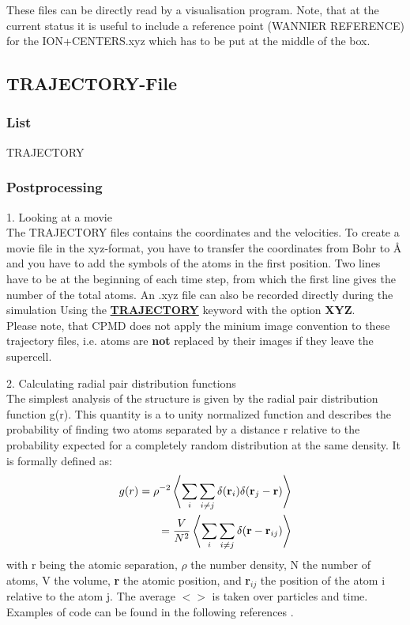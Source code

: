 \documentclass[twoside,10pt,titlepage,a4paper]{article}
\newcommand{\referto}[2]{\hyperlink{#1}{#2}}
\newcommand{\referto}[2]{\htmlref{#2}{#1}}
\newcommand{\refkeyword}[1]{%
\referto{#1}{\textbf{#1}}%
\index{#1}%
}%
\begin{document}
  These files can be directly read by a visualisation program. Note, that at
the current status it is useful to include a reference point (WANNIER
REFERENCE) for the ION+CENTERS.xyz which has to be put at the middle of the
box.

\subsection{TRAJECTORY-File}

\subsubsection{List}

TRAJECTORY

\subsubsection{Postprocessing}

1. Looking at a movie\hfill\\
The TRAJECTORY files contains the coordinates and the
velocities. To create a movie file in the xyz-format, you have to transfer the
coordinates from Bohr to {\AA} and you have to add the symbols of the atoms in
the first position. Two lines have to be at the beginning of each time step,
from which the first line gives the number of the total atoms. An .xyz
file can also be recorded directly during the simulation Using the
\refkeyword{TRAJECTORY} keyword with the option {\bf XYZ}.\\
Please note, that CPMD does not apply the minium image convention
to these trajectory files, i.e. atoms are \textbf{not} replaced by their
images if they leave the supercell.

\medskip

 2. Calculating radial pair distribution functions\hfill\\
The simplest analysis of the structure is
given by the radial pair distribution function g(r). This quantity is a to
unity normalized function and describes the probability of finding two atoms
separated by a distance r relative to the probability expected for a completely
random distribution at the same density. It is formally defined as:
\begin{eqnarray*}
g(r)=\rho^{-2}\left < \sum_i\sum_{i\neq j} \delta({\bf r}_i)
\delta({\bf r}_j-{\bf r}) \right > \nonumber\\
= \frac{V}{N^2}\left < \sum_i\sum_{i\neq j} \delta({\bf r}-{\bf r}_{ij})
 \right >
\end{eqnarray*}
with r being the atomic separation, $\rho$ the number density, N the number of
atoms, V the volume, {\textbf r} the atomic position, and {\textbf r$_{ij}$}
the position of the atom i relative to the atom j. The average $<>$ is taken
over particles and time. Examples of code can be found in the following
references \cite{Allen87,Frenkel02}.
\end{document}
